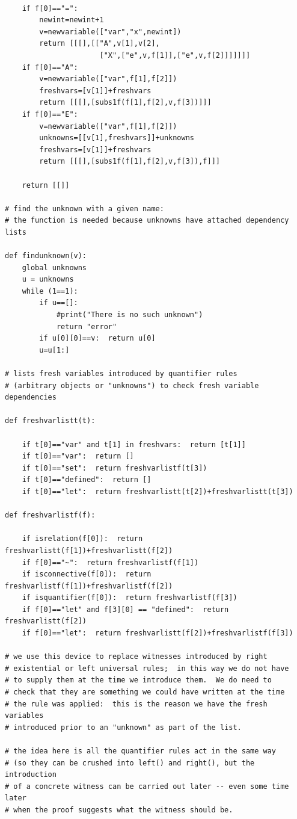 \documentclass{article}
\begin{document}
\begin{verbatim}
    
    if f[0]=="=":
        newint=newint+1
        v=newvariable(["var","x",newint])
        return [[[],[["A",v[1],v[2],
                      ["X",["e",v,f[1]],["e",v,f[2]]]]]]]
    if f[0]=="A":
        v=newvariable(["var",f[1],f[2]])
        freshvars=[v[1]]+freshvars
        return [[[],[subs1f(f[1],f[2],v,f[3])]]]
    if f[0]=="E":
        v=newvariable(["var",f[1],f[2]])
        unknowns=[[v[1],freshvars]]+unknowns
        freshvars=[v[1]]+freshvars
        return [[[],[subs1f(f[1],f[2],v,f[3]),f]]]

    return [[]]

# find the unknown with a given name:
# the function is needed because unknowns have attached dependency lists

def findunknown(v):
    global unknowns
    u = unknowns
    while (1==1):
        if u==[]:
            #print("There is no such unknown")
            return "error"
        if u[0][0]==v:  return u[0]
        u=u[1:]

# lists fresh variables introduced by quantifier rules
# (arbitrary objects or "unknowns") to check fresh variable dependencies

def freshvarlistt(t):

    if t[0]=="var" and t[1] in freshvars:  return [t[1]]
    if t[0]=="var":  return []
    if t[0]=="set":  return freshvarlistf(t[3])
    if t[0]=="defined":  return []
    if t[0]=="let":  return freshvarlistt(t[2])+freshvarlistt(t[3])

def freshvarlistf(f):

    if isrelation(f[0]):  return freshvarlistt(f[1])+freshvarlistt(f[2])
    if f[0]=="~":  return freshvarlistf(f[1])
    if isconnective(f[0]):  return freshvarlistf(f[1])+freshvarlistf(f[2])
    if isquantifier(f[0]):  return freshvarlistf(f[3])
    if f[0]=="let" and f[3][0] == "defined":  return freshvarlistt(f[2])
    if f[0]=="let":  return freshvarlistt(f[2])+freshvarlistf(f[3])

# we use this device to replace witnesses introduced by right
# existential or left universal rules;  in this way we do not have
# to supply them at the time we introduce them.  We do need to
# check that they are something we could have written at the time
# the rule was applied:  this is the reason we have the fresh variables
# introduced prior to an "unknown" as part of the list.

# the idea here is all the quantifier rules act in the same way
# (so they can be crushed into left() and right(), but the introduction
# of a concrete witness can be carried out later -- even some time later
# when the proof suggests what the witness should be.


\end{verbatim}
\end{document}
